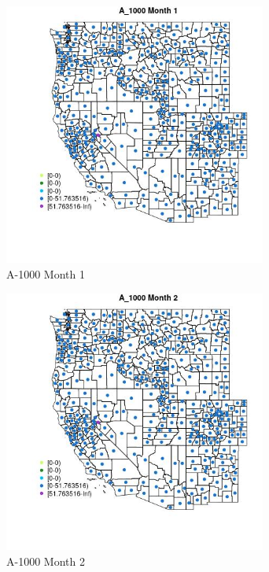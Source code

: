 \begin{figure} 
\centering  
\includegraphics[width=0.77\textwidth]{Code_Outputs/df_report_ML_predictors_CountyCentroid_Locations_Dates_2008-01-01to2018-12-31_MapObsMo1A_1000.jpg} 
\caption{\label{fig:df_report_ML_predictors_CountyCentroid_Locations_Dates_2008-01-01to2018-12-31MapObsMo1A_1000}A-1000 Month 1} 
\end{figure} 
 

\begin{figure} 
\centering  
\includegraphics[width=0.77\textwidth]{Code_Outputs/df_report_ML_predictors_CountyCentroid_Locations_Dates_2008-01-01to2018-12-31_MapObsMo2A_1000.jpg} 
\caption{\label{fig:df_report_ML_predictors_CountyCentroid_Locations_Dates_2008-01-01to2018-12-31MapObsMo2A_1000}A-1000 Month 2} 
\end{figure} 
 


